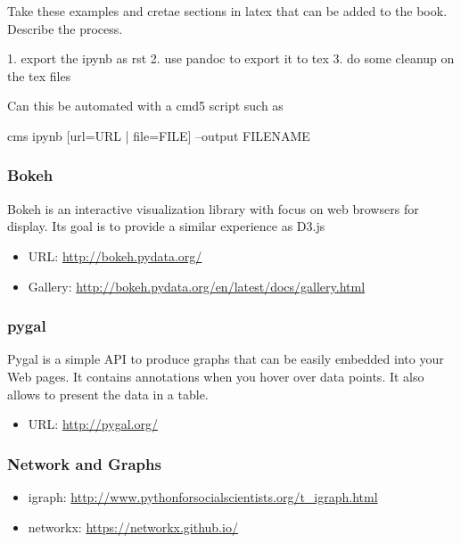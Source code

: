 \begin{exercise}\label{E:ipynb-export}
Take these examples and cretae sections in latex that can be added to
the book. Describe the process. 

1. export the ipynb as rst
2. use pandoc to export it to tex
3. do some cleanup on the tex files

Can this be automated with a cmd5 script such as
\begin{lstlistings}
cms ipynb [url=URL | file=FILE] --output FILENAME
\end{lstlistings}
\begin{exercise}

\subsubsection{Bokeh}\label{bokeh}

Bokeh is an interactive visualization library with focus on web browsers
for display. Its goal is to provide a similar experience as D3.js

\begin{itemize}
\tightlist
\item
  URL: \url{http://bokeh.pydata.org/}
\item
  Gallery: \url{http://bokeh.pydata.org/en/latest/docs/gallery.html}
\end{itemize}

\subsubsection{pygal}\label{pygal}

Pygal is a simple API to produce graphs that can be easily embedded into
your Web pages. It contains annotations when you hover over data points.
It also allows to present the data in a table.

\begin{itemize}
\tightlist
\item
  URL: \url{http://pygal.org/}
\end{itemize}

\subsubsection{Network and Graphs}\label{network-and-graphs}

\begin{itemize}
\tightlist
\item
  igraph: \url{http://www.pythonforsocialscientists.org/t_igraph.html}
\item
  networkx: \url{https://networkx.github.io/}
\end{itemize}


\end{exercise}
\end{exercise}
